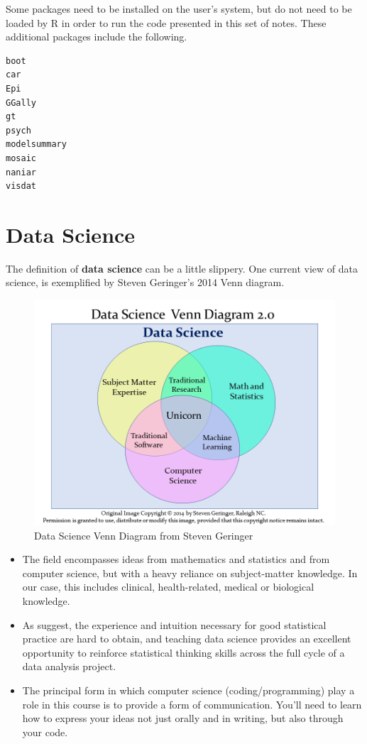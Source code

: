 \documentclass[
]{book}
\providecommand{\tightlist}{%
  \setlength{\itemsep}{0pt}\setlength{\parskip}{0pt}}
\begin{document}
Some packages need to be installed on the user's system, but do not need to be loaded by R in order to run the code presented in this set of notes. These additional packages include the following.

\begin{verbatim}
boot
car
Epi
GGally
gt
psych
modelsummary
mosaic
naniar
visdat
\end{verbatim}

\hypertarget{data-science}{%
\chapter{Data Science}\label{data-science}}

The definition of \textbf{data science} can be a little slippery. One current view of data science, is exemplified by Steven Geringer's 2014 Venn diagram.

\begin{figure}
\includegraphics[width=0.8\linewidth]{figures/data-science-venn20} \caption{Data Science Venn Diagram from Steven Geringer}\label{fig:datasci-fig}
\end{figure}

\begin{itemize}
\tightlist
\item
  The field encompasses ideas from mathematics and statistics and from computer science, but with a heavy reliance on subject-matter knowledge. In our case, this includes clinical, health-related, medical or biological knowledge.
\item
  As \citet{Gelman-Nolan} suggest, the experience and intuition necessary for good statistical practice are hard to obtain, and teaching data science provides an excellent opportunity to reinforce statistical thinking skills across the full cycle of a data analysis project.
\item
  The principal form in which computer science (coding/programming) play a role in this course is to provide a form of communication. You'll need to learn how to express your ideas not just orally and in writing, but also through your code.
\end{itemize}
\end{document}
